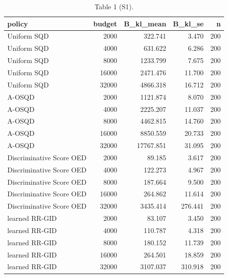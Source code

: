 \begin{table}[t]
\centering
\small
\caption{Table 1 (S1).}
\label{tab:Table_1_S1}
\begin{tabular}{lrrrr}
\toprule
policy & budget & B\_kl\_mean & B\_kl\_se & n \\
\midrule
Uniform SQD & 2000 & 322.741 & 3.470 & 200 \\
Uniform SQD & 4000 & 631.622 & 6.286 & 200 \\
Uniform SQD & 8000 & 1233.799 & 7.675 & 200 \\
Uniform SQD & 16000 & 2471.476 & 11.700 & 200 \\
Uniform SQD & 32000 & 4866.318 & 16.712 & 200 \\
A-OSQD & 2000 & 1121.874 & 8.070 & 200 \\
A-OSQD & 4000 & 2225.207 & 11.037 & 200 \\
A-OSQD & 8000 & 4462.815 & 14.760 & 200 \\
A-OSQD & 16000 & 8850.559 & 20.733 & 200 \\
A-OSQD & 32000 & 17767.851 & 31.095 & 200 \\
Discriminative Score OED & 2000 & 89.185 & 3.617 & 200 \\
Discriminative Score OED & 4000 & 122.273 & 4.967 & 200 \\
Discriminative Score OED & 8000 & 187.664 & 9.500 & 200 \\
Discriminative Score OED & 16000 & 264.862 & 11.614 & 200 \\
Discriminative Score OED & 32000 & 3435.414 & 276.441 & 200 \\
learned RR-GID & 2000 & 83.107 & 3.450 & 200 \\
learned RR-GID & 4000 & 110.787 & 4.318 & 200 \\
learned RR-GID & 8000 & 180.152 & 11.739 & 200 \\
learned RR-GID & 16000 & 264.501 & 18.859 & 200 \\
learned RR-GID & 32000 & 3107.037 & 310.918 & 200 \\
\bottomrule
\end{tabular}
\end{table}
